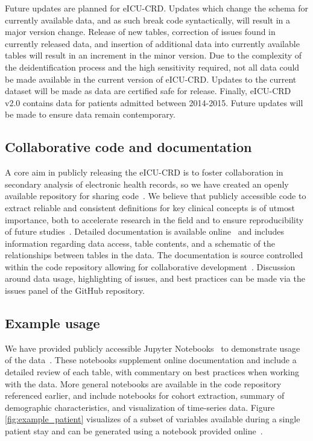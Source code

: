 \documentclass[english]{article}
\begin{document}
Future updates are planned for eICU-CRD. Updates which change the schema for currently available data, and as such break code syntactically, will result in a major version change. Release of new tables, correction of issues found in currently released data, and insertion of additional data into currently available tables will result in an increment in the minor version.
Due to the complexity of the deidentification process and the high sensitivity required, not all data could be made available in the current version of eICU-CRD.
Updates to the current dataset will be made as data are certified safe for release.
Finally, eICU-CRD v2.0 contains data for patients admitted between 2014-2015. Future updates will be made to ensure data remain contemporary.

\subsection*{Collaborative code and documentation}\label{collaborative-code-and-documentation}

A core aim in publicly releasing the eICU-CRD is to foster collaboration in secondary analysis of electronic health records, so we have created an openly available repository for sharing code~\cite{eicu-code}. We believe that publicly accessible code to extract reliable and consistent definitions for key clinical concepts is of utmost importance, both to accelerate research in the field and to ensure reproducibility of future studies~\cite{Wilson2014, johnson2017reproducibility}.
Detailed documentation is available online~\cite{eicu-website} and includes information regarding data access, table contents, and a schematic of the relationships between tables in the data.
The documentation is source controlled within the code repository allowing for collaborative development~\cite{eicu-code}. Discussion around data usage, highlighting of issues, and best practices can be made via the issues panel of the GitHub repository.

\subsection*{Example usage}\label{example-usage}

We have provided publicly accessible Jupyter Notebooks~\cite{pergra2007ipython, kluyver2016jupyter} to demonstrate usage of the data~\cite{eicu-data-paper}.
These notebooks supplement online documentation and include a detailed review of each table, with commentary on best practices when working with the data. More general notebooks are available in the code repository referenced earlier, and include notebooks for cohort extraction, summary of demographic characteristics, and visualization of time-series data. Figure \ref{fig:example_patient} visualizes of a subset of variables available during a single patient stay and can be generated using a notebook provided online~\cite{eicu-data-paper}.
\end{document}
